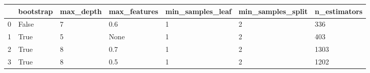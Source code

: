 \begin{tabular}{lllllll}
\toprule
{} & bootstrap & max\_depth & max\_features & min\_samples\_leaf & min\_samples\_split & n\_estimators \\
\midrule
0 &     False &         7 &          0.6 &                1 &                 2 &          336 \\
1 &      True &         5 &         None &                1 &                 2 &          403 \\
2 &      True &         8 &          0.7 &                1 &                 2 &         1303 \\
3 &      True &         8 &          0.5 &                1 &                 2 &         1202 \\
\bottomrule
\end{tabular}

